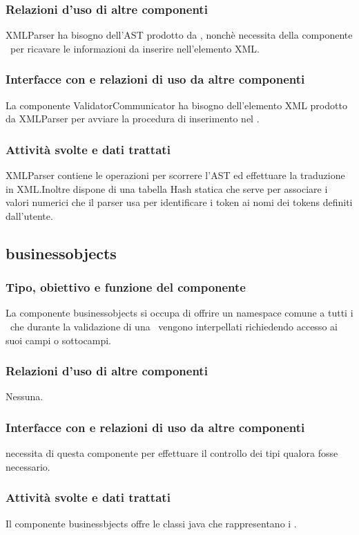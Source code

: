 \documentclass[11pt,titlepage,a4paper]{report}
\begin{document}
\subsubsection{Relazioni d'uso di altre componenti}
XMLParser ha bisogno dell'AST prodotto da \brp, nonch\`e necessita della componente \br\ per ricavare le informazioni da inserire nell'elemento XML.
\subsubsection{Interfacce con e relazioni di uso da altre componenti}
La componente ValidatorCommunicator ha bisogno dell'elemento XML prodotto da XMLParser per avviare la procedura di inserimento nel \re.
\subsubsection{Attivit\`a svolte e dati trattati}
XMLParser  contiene le operazioni per scorrere l'AST ed effettuare la traduzione in XML.Inoltre dispone di una tabella Hash statica che serve per associare i valori numerici che il parser usa per identificare i token ai nomi dei tokens definiti dall'utente.

\subsection{businessobjects}%
\subsubsection{Tipo, obiettivo e funzione del componente}
La componente businessobjects si occupa di offrire un namespace comune a tutti i \bos\ che durante la validazione di una \br\ vengono interpellati richiedendo accesso ai suoi campi o sottocampi.
\subsubsection{Relazioni d'uso di altre componenti}
Nessuna.
\subsubsection{Interfacce con e relazioni di uso da altre componenti}
\brp necessita di questa componente per effettuare il controllo dei tipi qualora fosse necessario.
\subsubsection{Attivit\`a svolte e dati trattati}
Il componente businessbjects offre le classi java che rappresentano i \bos.
\end{document}

